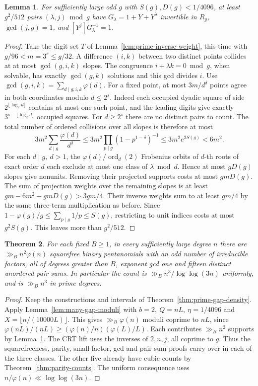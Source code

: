\documentclass[11pt]{article}
\newtheorem{theorem}{Theorem}
\newtheorem{lemma}[theorem]{Lemma}
\newcommand{\ord}{\operatorname{ord}}
\begin{document}
\begin{lemma}\label{lem:composite-inverse-weight}
For sufficiently large odd \(g\) with \(S(g),D(g)<1/4096\), at least
\(g^2/512\) pairs \((\lambda,j)\bmod g\) have
\(G_\lambda=1+Y+Y^\lambda\) invertible in \(R_g\),
\(\gcd(j,g)=1\), and \([Y^j]G_\lambda^{-1}=1\).
\end{lemma}
\begin{proof}
Take the digit set \(T\) of Lemma~\ref{lem:prime-inverse-weight},
this time with \(g/96<m=3^s\le g/32\). A difference \((i,k)\)
between two distinct points collides at at most \(\gcd(g,i,k)\)
slopes. The congruence \(i+\lambda k=0\bmod g\), when solvable,
has exactly \(\gcd(g,k)\) solutions and this gcd divides \(i\).
Use \(\gcd(g,i,k)=\sum_{d\mid g,i,k}\varphi(d)\).
For a fixed point, at most \(3m/d^\delta\) points agree in both
coordinates modulo \(d\le2^s\). Indeed each occupied dyadic square
of side \(2^{\lfloor\log_2 d\rfloor}\) contains at most one such
point, and the leading digits give exactly
\(3^{s-\lfloor\log_2 d\rfloor}\) occupied squares. For
\(d\ge2^s\) there are no distinct pairs to count.
The total number of ordered collisions over all slopes is therefore at most
\[
 3m^2\sum_{d\mid g}\frac{\varphi(d)}{d^\delta}
 \le 3m^2\prod_{p\mid g}(1-p^{1-\delta})^{-1}
 \le 3m^2 e^{2S(g)}<6m^2.
\]
For each \(d\mid g,\ d>1\), the \(\varphi(d)/\ord_d(2)\)
Frobenius orbits of \(d\)-th roots of exact order \(d\) each exclude
at most one class of \(\lambda\bmod d\). Hence at most \(gD(g)\)
slopes give nonunits. Removing their projected supports costs at most
\(gmD(g)\). The sum of projection weights over the remaining
slopes is at least \(gm-6m^2-gmD(g)>3gm/4\).
Their inverse weights sum to at least \(gm/4\) by the same three-term
multiplication as before. Since \(1-\varphi(g)/g\le\sum_{p\mid g}1/p
\le S(g)\), restricting to unit indices costs at most \(g^2 S(g)\).
This leaves more than \(g^2/512\).
\end{proof}

\begin{theorem}\label{thm:totient-parity}
For each fixed \(B\ge1\), in every sufficiently large degree \(n\)
there are \(\gg_B n^2\varphi(n)\) squarefree binary pentanomials
with an odd number of irreducible factors, all of degrees greater
than \(B\), exponent gcd one and fifteen distinct unordered pair sums.
In particular the count is \(\gg_B n^3/\log\log(3n)\) uniformly,
and is \(\gg_B n^3\) in prime degrees.
\end{theorem}
\begin{proof}
Keep the constructions and intervals of Theorem~\ref{thm:prime-gap-density}.
Apply Lemma~\ref{lem:many-gap-moduli} with \(b=2,\ Q=nL,\ \eta=1/4096\)
and \(X=\lfloor n/(10000L)\rfloor\). This gives
\(\gg_B\varphi(n)\) moduli coprime to \(nL\), since
\(\varphi(nL)/(nL)\ge(\varphi(n)/n)(\varphi(L)/L)\).
Each contributes \(\gg_B n^2\) supports by
Lemma~\ref{lem:composite-inverse-weight}. The CRT lift uses the
inverses of \(2,n,j\), all coprime to \(g\). Thus the
squarefreeness, parity, small-factor, gcd and pair-sum proofs carry
over in each of the three classes. The other five already have cubic
counts by Theorem~\ref{thm:parity-counts}. The uniform consequence
uses \(n/\varphi(n)\ll\log\log(3n)\).
\end{proof}
\end{document}
